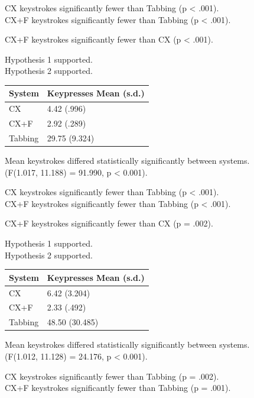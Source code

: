 \documentclass[a4paper, 12pt]{report}
\begin{document}
CX keystrokes significantly fewer than Tabbing (p < .001).\\
CX+F keystrokes significantly fewer than Tabbing (p < .001).

CX+F keystrokes significantly fewer than CX (p < .001).

Hypothesis 1 supported.\\
Hypothesis 2 supported.

\begin{tabular}{l l}
\hline\hline %
System & Keypresses Mean (s.d.) \\ [0.5ex] %
\hline %
CX & 4.42 (.996)\\
CX+F & 2.92 (.289)\\
Tabbing & 29.75 (9.324)\\ [1ex] %
\hline %
\end{tabular}

Mean keystrokes differed statistically significantly between systems.\\
(F(1.017, 11.188) = 91.990, p < 0.001).

CX keystrokes significantly fewer than Tabbing (p < .001).\\
CX+F keystrokes significantly fewer than Tabbing (p < .001).

CX+F keystrokes significantly fewer than CX (p = .002).

Hypothesis 1 supported.\\
Hypothesis 2 supported.

\begin{tabular}{l l}
\hline\hline %
System & Keypresses Mean (s.d.) \\ [0.5ex] %
\hline %
CX & 6.42 (3.204)\\
CX+F & 2.33 (.492)\\
Tabbing & 48.50 (30.485)\\ [1ex] %
\hline %
\end{tabular}

Mean keystrokes differed statistically significantly between systems.\\
(F(1.012, 11.128) = 24.176, p < 0.001).

CX keystrokes significantly fewer than Tabbing (p = .002).\\
CX+F keystrokes significantly fewer than Tabbing (p = .001).
\end{document}
